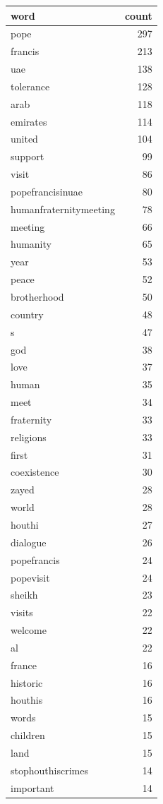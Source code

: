 \begin{tabular}{lr}
\toprule
word & count \\
\midrule
pope & 297 \\
francis & 213 \\
uae & 138 \\
tolerance & 128 \\
arab & 118 \\
emirates & 114 \\
united & 104 \\
support & 99 \\
visit & 86 \\
popefrancisinuae & 80 \\
humanfraternitymeeting & 78 \\
meeting & 66 \\
humanity & 65 \\
year & 53 \\
peace & 52 \\
brotherhood & 50 \\
country & 48 \\
s & 47 \\
god & 38 \\
love & 37 \\
human & 35 \\
meet & 34 \\
fraternity & 33 \\
religions & 33 \\
first & 31 \\
coexistence & 30 \\
zayed & 28 \\
world & 28 \\
houthi & 27 \\
dialogue & 26 \\
popefrancis & 24 \\
popevisit & 24 \\
sheikh & 23 \\
visits & 22 \\
welcome & 22 \\
al & 22 \\
france & 16 \\
historic & 16 \\
houthis & 16 \\
words & 15 \\
children & 15 \\
land & 15 \\
stophouthiscrimes & 14 \\
important & 14 \\

\end{tabular}
